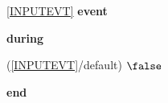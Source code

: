 \noindent \ref{INPUTEVT}  \textbf{event}
\begin{block}
  \item   \textbf{during}
  \begin{block}
  \item[ (\ref{INPUTEVT}/default) ]{$\false $} %
  \end{block}
  \item   \textbf{end} \\
\end{block}
